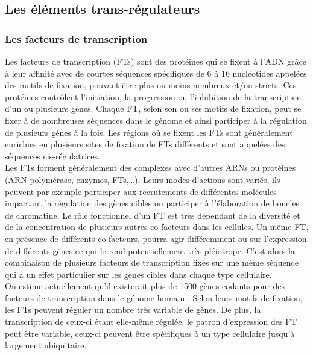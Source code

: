 \subsection{Les éléments \gls{trans}-régulateurs}
\label{subsec:elem-trans}

\subsubsection{Les facteurs de transcription}
\label{subsubsec:facteur-trans}

Les facteurs de transcription (\acrshort{FT}s) sont des protéines qui se fixent à l’ADN grâce à leur affinité avec de courtes séquences spécifiques de 6 à 16 nucléotides appelées des motifs de fixation, pouvant être plus ou moins nombreux et/ou stricts. Ces protéines contrôlent l’initiation, la progression ou l’inhibition de la transcription d’un ou plusieurs gènes. Chaque \acrshort{FT}, selon son ou ses motifs de fixation, peut se fixer à de nombreuses séquences dans le génome et ainsi participer à la régulation de plusieurs gènes à la fois. Les régions où se fixent les \acrshort{FT}s sont généralement enrichies en plusieurs sites de fixation de \acrshort{FT}s différents et sont appelées des séquences \gls{cis}-régulatrices.\\

Les \acrshort{FT}s forment généralement des complexes avec d’autres \acrshort{ARN}s ou protéines (ARN polymérase, enzymes, \acrshort{FT}s,…). Leurs modes d’actions sont variés, ils peuvent par exemple participer aux recrutements de différentes molécules impactant la régulation des gènes cibles ou participer à l’élaboration de boucles de chromatine. Le rôle fonctionnel d’un \acrshort{FT} est très dépendant de la diversité et de la concentration de plusieurs autres co-facteurs dans les cellules. Un même \acrshort{FT}, en présence de différents co-facteurs, pourra agir différemment ou sur l’expression de différents gènes ce qui le rend potentiellement très pléiotrope. C’est alors la combinaison de plusieurs facteurs de transcription fixés sur une même séquence qui a un effet particulier sur les gènes cibles dans chaque type cellulaire. \\

On estime actuellement qu’il existerait plus de 1500 gènes codants pour des facteurs de transcription dans le génome humain \citep{wingender_tfclass_2018}. Selon leurs motifs de fixation, les \acrshort{FT}s peuvent réguler un nombre très variable de gènes. De plus, la transcription de ceux-ci étant elle-même régulée, le patron d’expression des \acrshort{FT} peut être variable, ceux-ci peuvent être spécifiques à un type cellulaire jusqu'à largement ubiquitaire.

